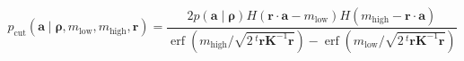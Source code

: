 \documentclass{article}
\newcommand{\inprod}[2]{\ensuremath{#1 \cdot #2}}
\newcommand{\pr}[1]{\left(#1\right)}
\newcommand{\tr}[1]{\ensuremath{\,{}^{t}\!#1}}
\DeclareMathOperator{\erf}{erf}
\newcommand{\Kst}{\ensuremath{\bm{K}}}
\newcommand{\hyper}{\ensuremath{\bm{\rho}}}
\begin{document}
\begin{equation}
  \label{eq:34}
    p_{\mathrm{cut}}\pr{\bm{a} \mid \hyper, m_{\mathrm{low}}, m_{\mathrm{high}}, \bm{r}}
    =
    \frac{
      2p\pr{\bm{a} \mid \hyper}
      H\pr{\inprod{\bm{r}}{\bm{a}} - m_{\mathrm{low}}}
      H\pr{m_{\mathrm{high}} - \inprod{\bm{r}}{\bm{a}}}
    }{
      \erf{\pr{m_{\mathrm{high}}/\sqrt{2\tr{\bm{r}}\Kst^{-1}\bm{r}}}}
      -
      \erf{\pr{m_{\mathrm{low}}/\sqrt{2\tr{\bm{r}}\Kst^{-1}\bm{r}}}}
    }
\end{equation}
\end{document}
